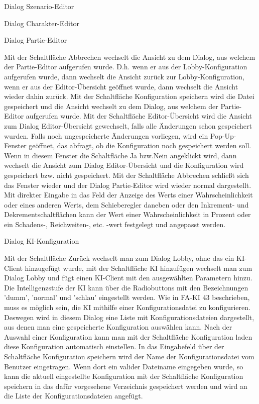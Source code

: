 Dialog \glqq{}Szenario-Editor\grqq{}

Dialog \glqq{}Charakter-Editor\grqq{}

Dialog \glqq{}Partie-Editor\grqq{}

Mit der Schaltfläche \glqq{}Abbrechen\grqq{} wechselt die Ansicht zu dem Dialog, aus welchem der Partie-Editor aufgerufen wurde. D.h. wenn er aus der Lobby-Konfiguration aufgerufen wurde, dann wechselt die Ansicht zurück zur Lobby-Konfiguration, wenn er aus der Editor-Übersicht geöffnet wurde, dann wechselt die Ansicht wieder dahin zurück.
Mit der Schaltfläche \glqq{}Konfiguration speichern\grqq{} wird die Datei gespeichert und die Ansicht wechselt zu dem Dialog,  aus welchem der Partie-Editor aufgerufen wurde.
Mit der Schaltfläche \glqq{}Editor-Übersicht\grqq{} wird die Ansicht zum Dialog \glqq{}Editor-Übersicht\grqq{} gewechselt, falls alle Änderungen schon gespeichert wurden. Falls noch ungespeicherte Änderungen vorliegen, wird ein Pop-Up-Fenster geöffnet, das abfragt, ob die Konfiguration noch gespeichert werden soll. Wenn in diesem Fenster die Schaltfläche \glqq{}Ja\grqq{} bzw.\glqq{}Nein\grqq{} angeklickt wird, dann wechselt die Ansicht zum Dialog \glqq{}Editor-Übersicht\grqq{} und die Konfiguration wird gespeichert bzw. nicht gespeichert. Mit der Schaltfläche \glqq{}Abbrechen\grqq{} schließt sich das Fenster wieder und der Dialog \glqq{}Partie-Editor\grqq{} wird wieder normal dargestellt.
Mit direkter Eingabe in das Feld der Anzeige des Werts einer Wahrscheinlichkeit oder eines anderen Werts, dem Schieberegler daneben oder den Inkrement- und Dekrementschaltflächen kann der Wert einer Wahrscheinlichkeit in Prozent oder ein Schadens-, Reichweiten-, etc. -wert festgelegt und angepasst werden.

Dialog \glqq{}KI-Konfiguration\grqq{}

Mit der Schaltfläche \glqq{}Zurück\grqq{} wechselt man zum Dialog \glqq{}Lobby\grqq{}, ohne das ein KI-Client hinzugefügt wurde, mit der Schaltfläche \glqq{}KI hinzufügen\grqq{} wechselt man zum Dialog \glqq{}Lobby\grqq{} und fügt einen KI-Client mit den ausgewählten Parametern hinzu.
Die Intelligenzstufe der KI kann über die Radiobuttons mit den Bezeichnungen 'dumm', 'normal' und 'schlau' eingestellt werden.
Wie in FA-KI 43 beschrieben, muss es möglich sein, die KI mithilfe einer Konfigurationsdatei zu konfigurieren. Deswegen wird in diesem Dialog eine Liste mit Konfigurationsdateien dargestellt, aus denen man eine gespeicherte Konfiguration auswählen kann. Nach der Auswahl einer Konfiguration kann man mit der Schaltfläche \glqq{}Konfiguration laden\grqq{} diese Konfiguration automatisch einstellen.
In das Eingabefeld über der Schaltfläche \glqq{}Konfiguration speichern\grqq{} wird der Name der Konfigurationsdatei vom Benutzer eingetragen. Wenn dort ein valider Dateiname eingegeben wurde, so kann die aktuell eingestellte Konfiguration mit der Schaltfläche \glqq{}Konfiguration speichern\grqq{} in das dafür vorgesehene Verzeichnis gespeichert werden und wird an die Liste der Konfigurationsdateien angefügt.